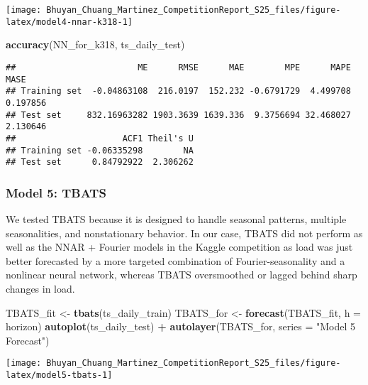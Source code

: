 \documentclass[
]{article}
\newenvironment{Shaded}{\begin{snugshade}}{\end{snugshade}}
\newcommand{\AttributeTok}[1]{\textcolor[rgb]{0.13,0.29,0.53}{#1}}
\newcommand{\FunctionTok}[1]{\textcolor[rgb]{0.13,0.29,0.53}{\textbf{#1}}}
\newcommand{\NormalTok}[1]{#1}
\newcommand{\OtherTok}[1]{\textcolor[rgb]{0.56,0.35,0.01}{#1}}
\newcommand{\SpecialCharTok}[1]{\textcolor[rgb]{0.81,0.36,0.00}{\textbf{#1}}}
\newcommand{\StringTok}[1]{\textcolor[rgb]{0.31,0.60,0.02}{#1}}
\begin{document}
\begin{center}\texttt{[image: Bhuyan\_Chuang\_Martinez\_CompetitionReport\_S25\_files/figure-latex/model4-nnar-k318-1]} \end{center}

\begin{Shaded}
\begin{Highlighting}[]
\FunctionTok{accuracy}\NormalTok{(NN\_for\_k318, ts\_daily\_test)}
\end{Highlighting}
\end{Shaded}

\begin{verbatim}
##                        ME      RMSE      MAE        MPE      MAPE     MASE
## Training set  -0.04863108  216.0197  152.232 -0.6791729  4.499708 0.197856
## Test set     832.16963282 1903.3639 1639.336  9.3756694 32.468027 2.130646
##                     ACF1 Theil's U
## Training set -0.06335298        NA
## Test set      0.84792922  2.306262
\end{verbatim}

\subsubsection{Model 5: TBATS}\label{model-5-tbats}

We tested TBATS because it is designed to handle seasonal patterns,
multiple seasonalities, and nonstationary behavior. In our case, TBATS
did not perform as well as the NNAR + Fourier models in the Kaggle
competition as load was just better forecasted by a more targeted
combination of Fourier-seasonality and a nonlinear neural network,
whereas TBATS oversmoothed or lagged behind sharp changes in load.

\begin{Shaded}
\begin{Highlighting}[]
\NormalTok{TBATS\_fit }\OtherTok{\textless{}{-}} \FunctionTok{tbats}\NormalTok{(ts\_daily\_train)}
\NormalTok{TBATS\_for }\OtherTok{\textless{}{-}} \FunctionTok{forecast}\NormalTok{(TBATS\_fit, }\AttributeTok{h =}\NormalTok{ horizon)}
\FunctionTok{autoplot}\NormalTok{(ts\_daily\_test) }\SpecialCharTok{+} \FunctionTok{autolayer}\NormalTok{(TBATS\_for, }\AttributeTok{series =} \StringTok{"Model 5 Forecast"}\NormalTok{)}
\end{Highlighting}
\end{Shaded}

\begin{center}\texttt{[image: Bhuyan\_Chuang\_Martinez\_CompetitionReport\_S25\_files/figure-latex/model5-tbats-1]} \end{center}
\end{document}
